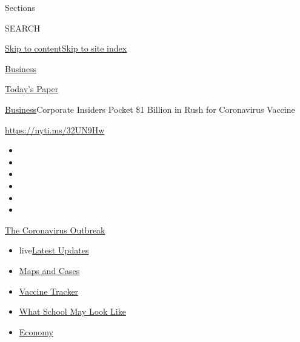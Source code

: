 Sections

SEARCH

\protect\hyperlink{site-content}{Skip to
content}\protect\hyperlink{site-index}{Skip to site index}

\href{https://www.nytimes3xbfgragh.onion/section/business}{Business}

\href{https://myaccount.nytimes3xbfgragh.onion/auth/login?response_type=cookie\&client_id=vi}{}

\href{https://www.nytimes3xbfgragh.onion/section/todayspaper}{Today's
Paper}

\href{/section/business}{Business}\textbar{}Corporate Insiders Pocket
\$1 Billion in Rush for Coronavirus Vaccine

\url{https://nyti.ms/32UN9Hw}

\begin{itemize}
\item
\item
\item
\item
\item
\item
\end{itemize}

\href{https://www.nytimes3xbfgragh.onion/news-event/coronavirus?action=click\&pgtype=Article\&state=default\&region=TOP_BANNER\&context=storylines_menu}{The
Coronavirus Outbreak}

\begin{itemize}
\tightlist
\item
  live\href{https://www.nytimes3xbfgragh.onion/2020/08/02/world/coronavirus-updates.html?action=click\&pgtype=Article\&state=default\&region=TOP_BANNER\&context=storylines_menu}{Latest
  Updates}
\item
  \href{https://www.nytimes3xbfgragh.onion/interactive/2020/us/coronavirus-us-cases.html?action=click\&pgtype=Article\&state=default\&region=TOP_BANNER\&context=storylines_menu}{Maps
  and Cases}
\item
  \href{https://www.nytimes3xbfgragh.onion/interactive/2020/science/coronavirus-vaccine-tracker.html?action=click\&pgtype=Article\&state=default\&region=TOP_BANNER\&context=storylines_menu}{Vaccine
  Tracker}
\item
  \href{https://www.nytimes3xbfgragh.onion/interactive/2020/07/29/us/schools-reopening-coronavirus.html?action=click\&pgtype=Article\&state=default\&region=TOP_BANNER\&context=storylines_menu}{What
  School May Look Like}
\item
  \href{https://www.nytimes3xbfgragh.onion/live/2020/07/31/business/stock-market-today-coronavirus?action=click\&pgtype=Article\&state=default\&region=TOP_BANNER\&context=storylines_menu}{Economy}
\end{itemize}

